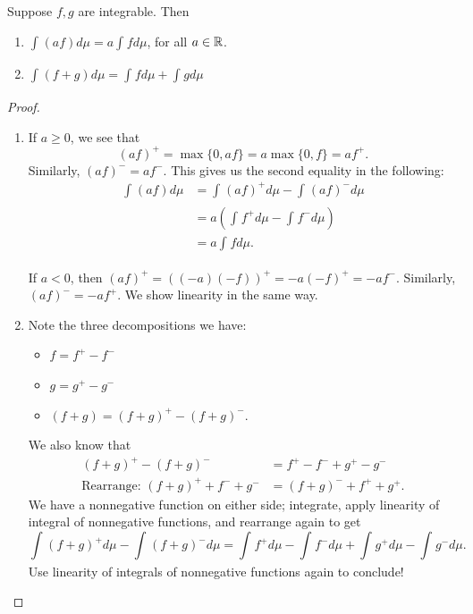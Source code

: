 \begin{lemma}
	Suppose $f,g$ are integrable. Then
	\begin{enumerate}[label=(\roman*)]
		\item $\int_{}^{} (af) d\mu = a \int_{}^{} fd\mu  $, for all $a \in \mathbb{R}$.
		\item $\int_{}^{} (f+g)d\mu = \int_{}^{} fd\mu + \int_{}^{} gd\mu   $
	\end{enumerate}
\end{lemma}

\begin{proof}
	\begin{enumerate}[label=(\roman*)]
		\item 	If $a \ge 0$, we see that \[
		(af)^+ = \max\{0,af\} = a \max\{0,f\} = af^+
	.\] Similarly, $(af)^- = af^-$. This gives us the second equality in the following:
	\begin{align*}
		\int_{}^{} (af)d\mu &= \int_{}^{} (af)^+ d\mu - \int_{}^{} (af)^- d\mu   \\ 
		&= a \left( \int_{}^{} f^+ d\mu - \int_{}^{} f^- d\mu   \right) \\
		&= a \int_{}^{} fd\mu 
	.\end{align*}

	If $a < 0$, then $(af)^+ = \left( (-a)(-f) \right)^{+} = -a (-f)^+ = -a f^-$. Similarly, $(af)^- = -af^+$. We show linearity in the same way.

		\item Note the three decompositions we have: 
				\begin{itemize}
					\item $f= f^+ - f^-$
					\item $g = g^+ - g^-$
					\item $(f+g) = \left( f+g \right)^{+} - \left( f+g \right)^-$.
				\end{itemize}
				We also know that 
				\begin{align*}
					(f+g)^+ - (f+g)^- &= f^+ - f^- + g^+ - g^- \\
					\text{Rearrange: } \left( f+g \right)^{+} + f^- + g^- &= (f+g)^- + f^+ + g^+
				.\end{align*}
				We have a nonnegative function on either side; integrate, apply linearity of integral of nonnegative functions, and rearrange again to get \[
					\int_{}^{} (f+g)^+ d\mu- \int_{}^{} (f+g)^- d\mu= \int_{}^{} f^+ d\mu - \int_{}^{} f^- d\mu + \int_{}^{} g^+ d\mu - \int_{}^{} g^- d\mu      
				.\] Use linearity of integrals of nonnegative functions again to conclude!
	\end{enumerate}
\end{proof}

